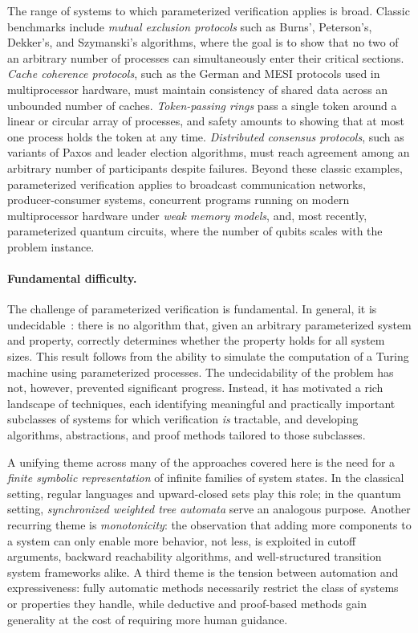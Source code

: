 The range of systems to which parameterized verification applies is broad.
Classic benchmarks include \emph{mutual exclusion protocols} such as Burns',
Peterson's, Dekker's, and Szymanski's algorithms, where the goal is to show
that no two of an arbitrary number of processes can simultaneously enter their
critical sections. \emph{Cache coherence protocols}, such as the German and
MESI protocols used in multiprocessor hardware, must maintain consistency of
shared data across an unbounded number of caches. \emph{Token-passing rings}
pass a single token around a linear or circular array of processes, and
safety amounts to showing that at most one process holds the token at any
time. \emph{Distributed consensus protocols}, such as variants of Paxos and
leader election algorithms, must reach agreement among an arbitrary number of
participants despite failures. Beyond these classic examples, parameterized
verification applies to broadcast communication networks, producer-consumer
systems, concurrent programs running on modern multiprocessor hardware under
\emph{weak memory models}, and, most recently, parameterized quantum circuits,
where the number of qubits scales with the problem instance.

\paragraph{Fundamental difficulty.}
The challenge of parameterized verification is fundamental. In general, it is
undecidable~\cite{AK86}: there is no algorithm that, given an arbitrary
parameterized system and property, correctly determines whether the property
holds for all system sizes. This result follows from the ability to simulate
the computation of a Turing machine using parameterized processes. The
undecidability of the problem has not, however, prevented significant
progress. Instead, it has motivated a rich landscape of techniques, each
identifying meaningful and practically important subclasses of systems for
which verification \emph{is} tractable, and developing algorithms,
abstractions, and proof methods tailored to those subclasses.

A unifying theme across many of the approaches covered here is the need for
a \emph{finite symbolic representation} of infinite families of system states.
In the classical setting, regular languages and upward-closed sets play this
role; in the quantum setting, \emph{synchronized weighted tree automata} serve
an analogous purpose. Another recurring theme is \emph{monotonicity}: the
observation that adding more components to a system can only enable more
behavior, not less, is exploited in cutoff arguments, backward reachability
algorithms, and well-structured transition system frameworks alike. A third
theme is the tension between automation and expressiveness: fully automatic
methods necessarily restrict the class of systems or properties they handle,
while deductive and proof-based methods gain generality at the cost of requiring
more human guidance.

